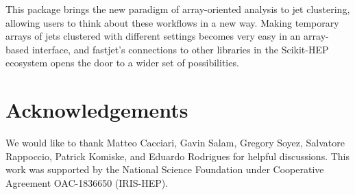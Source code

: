\documentclass[a4paper]{jpconf}
\begin{document}
This package brings the new paradigm of array-oriented analysis to jet clustering, allowing users to think about these workflows in a new way. Making temporary arrays of jets clustered with different settings becomes very easy in an array-based interface, and fastjet's connections to other libraries in the Scikit-HEP ecosystem opens the door to a wider set of possibilities.

\section{Acknowledgements}

We would like to thank Matteo Cacciari, Gavin Salam, Gregory Soyez, Salvatore Rappoccio, Patrick Komiske, and Eduardo Rodrigues for helpful discussions. This work was supported by the National Science Foundation under Cooperative Agreement OAC-1836650 (IRIS-HEP).

\printbibliography
\end{document}
